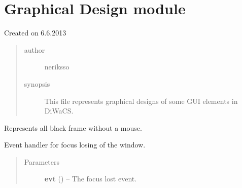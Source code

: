 \documentclass[letterpaper,10pt,english]{sphinxmanual}
\begin{document}
\section{Graphical Design module}
\label{graphicaldesign:graphical-design-module}\label{graphicaldesign:module-graphicaldesign}\label{graphicaldesign::doc}
Created on 6.6.2013
\begin{quote}\begin{description}
\item[{author}] \leavevmode
neriksso

\item[{synopsis}] \leavevmode
This file represents graphical designs of some GUI elements in DiWaCS.

\end{description}\end{quote}

\begin{fulllineitems}
\label{graphicaldesign:graphicaldesign.BlackOverlay}
Represents all black frame without a mouse.

\begin{fulllineitems}
\label{graphicaldesign:graphicaldesign.BlackOverlay.OnFocusLost}
Event handler for focus losing of the window.
\begin{quote}\begin{description}
\item[{Parameters}] \leavevmode
\textbf{evt} () -- The focus lost event.

\end{description}\end{quote}

\end{fulllineitems}


\end{fulllineitems}

\end{document}
